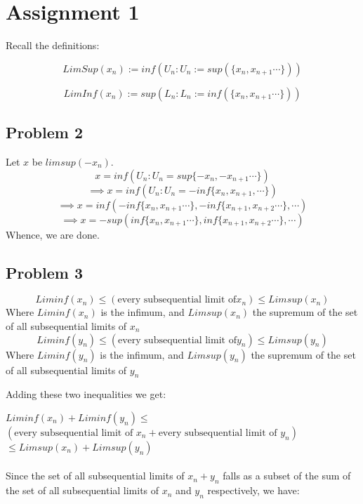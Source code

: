 \documentclass[../Main.tex]{subfiles}
\begin{document}
\chapter{Assignment 1}
Recall the definitions:

$$LimSup(x_n):=inf(U_n: U_n:=sup(\{x_n,x_{n+1} \cdots \})) $$

$$LimInf(x_n):=sup(L_n: L_n:=inf(\{x_n,x_{n+1} \cdots \})) $$

\section{Problem 2}
Let $x$ be $limsup(-x_n)$. $$x=inf(U_n: U_n=sup\{-x_n,-x_{n+1} \cdots \})$$
$$\implies x=inf(U_n:U_n=-inf\{x_n,x_{n+1},\cdots\})$$
$$\implies x=inf(-inf\{x_n,x_{n+1}\cdots \}, -inf\{x_{n+1},x_{n+2}\cdots \},\cdots)$$ 
$$\implies x=-sup(inf\{x_n,x_{n+1}\cdots \},inf\{x_{n+1},x_{n+2}\cdots \},\cdots) $$
Whence, we are done.
\section{Problem 3}

$$Liminf(x_n)\leq (\text{every subsequential limit of} x_n) \leq Limsup(x_n) $$
Where $Liminf(x_n)$ is the infimum, and $Limsup(x_n)$ the 
supremum of the set of all subsequential limits of $x_n$
$$Liminf(y_n)\leq (\text{every subsequential limit of} y_n) \leq Limsup(y_n) $$
Where $Liminf(y_n)$ is the infimum, and $Limsup(y_n)$ the 
supremum of the set of all subsequential limits of $y_n$

Adding these two inequalities we get:

$Liminf(x_n)+Liminf(y_n)\leq$ $(\text{every subsequential limit of } x_n+ \text{every subsequential limit of } y_n)$ $\leq Limsup(x_n)+Limsup(y_n) $
\\\\ Since the set of all subsequential limits of $x_n+y_n$ falls as a subset of the sum of the set of all subsequential limits of $x_n$ and $y_n$ respectively, we have: 
\end{document}
